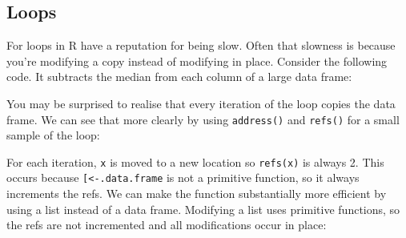 \subsection{Loops}

For loops in R have a reputation for being slow. Often that slowness is
because you're modifying a copy instead of modifying in place. Consider
the following code. It subtracts the median from each column of a large
data frame: 

\begin{Shaded}
\begin{Highlighting}[]
\StringTok{ }\NormalTok{(}\NormalTok{(}\NormalTok{(} \NormalTok{*}\StringTok{ }\NormalTok{), } \NormalTok{))}
\StringTok{ }\NormalTok{(}\NormalTok{))}

  \StringTok{ }\StringTok{ }
\NormalTok{\}}
\end{Highlighting}
\end{Shaded}

You may be surprised to realise that every iteration of the loop copies
the data frame. We can see that more clearly by using \texttt{address()}
and \texttt{refs()} for a small sample of the loop:

\begin{Shaded}
\begin{Highlighting}[]
\NormalTok{:}\NormalTok{) \{}
  \StringTok{ }\StringTok{ }
  \NormalTok{(}\NormalTok{(}
\NormalTok{\}}
\end{Highlighting}
\end{Shaded}

For each iteration, \texttt{x} is moved to a new location so
\texttt{refs(x)} is always 2. This occurs because
\texttt{{[}\textless{}-.data.frame} is not a primitive function, so it
always increments the refs. We can make the function substantially more
efficient by using a list instead of a data frame. Modifying a list uses
primitive functions, so the refs are not incremented and all
modifications occur in place:

